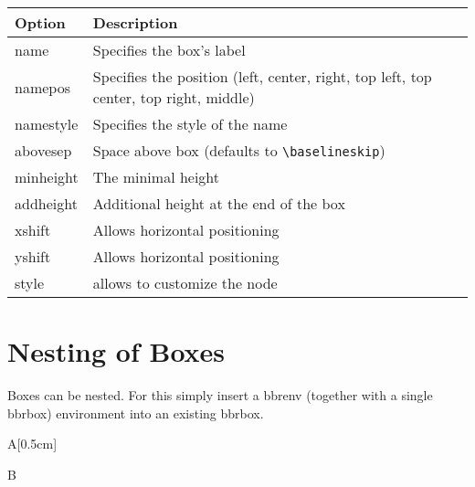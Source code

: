 \documentclass[a4paper]{report}
\begin{document}
\begin{center}
\begin{tabular}{ll}
\textbf{Option} & \textbf{Description} \\ \hline
name & Specifies the box's label \\
namepos & Specifies the position (left, center, right, top left, top center, top right, middle) \\
namestyle & Specifies the style of the name \\
abovesep & Space above box (defaults to \lstinline$\baselineskip$) \\
minheight & The minimal height \\
addheight & Additional height at the end of the box \\
xshift & Allows horizontal positioning \\
yshift & Allows horizontal positioning \\
style & allows to customize the node
\end{tabular}
\end{center}


\section{Nesting of Boxes}
Boxes can be nested. For this simply insert a bbrenv (together with a single bbrbox) environment into an
existing bbrbox.

\begin{bbrenv}[1cm]{A}[0.5cm]
	\begin{bbrbox}[name=Box Name]

	\begin{bbrenv}{B}
		\begin{bbrbox}[name=Inner Box]
		\end{bbrbox}
	\end{bbrenv}

	\end{bbrbox}
\end{bbrenv}
\end{document}
